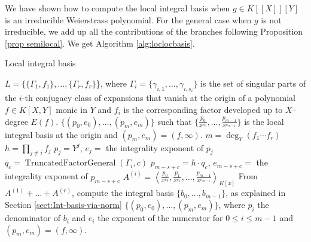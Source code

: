 \documentclass[a4paper,11pt]{amsart}%
\theoremstyle{definition}
\theoremstyle{plain}
\theoremstyle{remark}
\DeclareMathOperator{\TruncatedFactorGeneral}{TruncatedFactorGeneral}
\begin{document}
\vspace{0.5cm}

We have shown how to compute the local integral basis when $g \in K[[X]][Y]$ is an irreducible Weierstrass polynomial.
For the general case when $g$ is not irreducible, we add up all the contributions of the branches following Proposition \ref{prop semilocal}.
We get Algorithm \ref{alg:loclocbasis}.

\begin{algorithm}                      %
\caption{Local integral basis}          %
\label{alg:loclocbasis}
\begin{algorithmic}[1]
\REQUIRE $L = \{\{\varGamma_1, f_1\}, \dots, \{\varGamma_r, f_r\}$\}, where $\varGamma_i = \{\gamma_{i,1}, \dots, \gamma_{i,s_i}\}$ is the set of singular parts of the $i$-th conjugacy class of expansions that vanish at the origin of a polynomial $f \in K[X,Y]$ monic in $Y$ and $f_i$ is the corresponding factor developed up to $X$--degree $E(f)$.
\ENSURE $\{(p_0, e_0), \dots, (p_{m}, e_{m})\}$ such that $\{\frac{p_0}{x^{e_0}}, \dots, \frac{p_{m-1}}{x^{e_{m-1}}}\}$ is the local integral basis at the origin and $(p_m, e_m) = (f, \infty)$.
\STATE $m = \deg_Y(f_1 \cdots f_r)$
\STATE $h = \prod_{j \neq i} f_j$
\STATE $p_j = Y^j$, $e_j =$ the integrality exponent of $p_j$
\ENDFOR
{}
\STATE $q_c = \TruncatedFactorGeneral(\varGamma_i, c)$
\STATE $p_{m-s+c} = h \cdot q_c$, $e_{m-s+c} =$ the integrality exponent of $p_{m-s+c}$
\ENDFOR
\STATE $A^{(i)} = \left\langle \frac{p_{0}}{x^{e_{0}}}, \frac{p_{1}}{x^{e_{1}}},
\dots, \frac{p_{m-1}}{x^{e_{m-1}}}\right\rangle _{K[x]}$
\ENDFOR
\STATE From $A^{(1)} + \dots + A^{(r)}$, compute the integral basis $\{b_0, \dots, b_{m-1}\}$, as explained in Section \ref{sect:Int-basis-via-norm}
\RETURN $\{(p_0, e_0), \dots, (p_{m}, e_{m})\}$, where $p_i$ the denominator of $b_i$ and $e_i$ the exponent of the numerator for $0 \leq i \leq m-1$ and $(p_m, e_m) = (f, \infty)$.
\end{algorithmic}
\end{algorithm}
\end{document}
